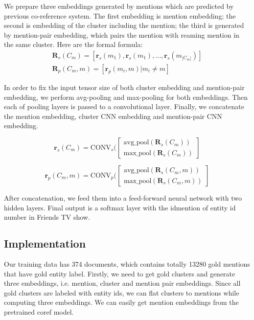 \documentclass[11pt]{article}
\begin{document}
We prepare three embeddings generated by mentions which are predicted by previous co-reference system. The first embedding is mention embedding; the second is embedding of the cluster including the mention; the third is generated by mention-pair embedding, which pairs the mention with reaming mention in the same cluster. Here are the formal formula:
\begin{eqnarray}
\mathbf{R}_s(C_m) = [\mathbf{r}_s(m_1),\mathbf{r}_s(m_1),...,\mathbf{r}_s(m_{|C_m|})]\\
\mathbf{R}_p(C_m,m) = [\mathbf{r}_p(m_i,m)|m_i \neq m]
\end{eqnarray}



In order to fix the input tensor size of both cluster embedding and mention-pair embedding, we perform avg-pooling and max-pooling for both embeddings. Then each of pooling layers is passed to a convolutional layer. Finally, we concatenate the mention embedding, cluster CNN embedding and mention-pair CNN embedding.

\begin{equation}
\mathbf{r}_s(C_m) = \textrm{CONV}_s(\begin{bmatrix}
\text{avg\_pool}(\mathbf{R}_s(C_m))\\
\text{max\_pool}(\mathbf{R}_s(C_m))
\end{bmatrix}
\end{equation}


\begin{equation}
\mathbf{r}_p(C_m,m) = \textrm{CONV}_p(\begin{bmatrix}
\text{avg\_pool}(\mathbf{R}_s(C_m,m))\\
\text{max\_pool}(\mathbf{R}_s(C_m,m))
\end{bmatrix}
\end{equation}


After concatenation, we feed them into a feed-forward neural network with two hidden layers. Final output is a softmax layer with the idmention of entity id number in Friends TV show.

\subsection{Implementation}
Our training data has 374 documents, which contains totally 13280 gold mentions that have gold entity label. Firstly, we need to get gold clusters and generate three embeddings, i.e. mention, cluster and mention pair embeddings. Since all gold clusters are labeled with entity ids, we can flat clusters to mentions while computing three embeddings. We can easily get mention embeddings from the pretrained coref model.
\end{document}

